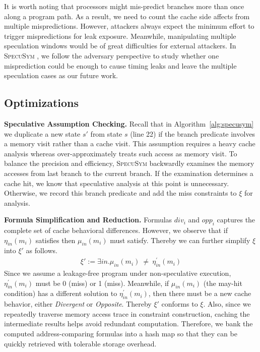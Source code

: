 \documentclass[sigconf]{acmart}
\newcommand{\SpecuSym}{\textsc{SpecuSym} }
\begin{document}
It is worth noting that processors might mis-predict branches more than once 
along a program path. As a result, we need to count the cache side affects 
from multiple mispredictions. However, attackers always expect the minimum 
effort to trigger mispredictions for leak exposure. Meanwhile, manipulating 
multiple speculation windows would be of great difficulties for external 
attackers. In \SpecuSym, we follow the adversary perspective to study whether 
one misprediction could be enough to cause timing leaks and leave the multiple 
speculation cases as our future work. 



\subsection{Optimizations}
\label{sec:optimize}


\textbf{Speculative Assumption Checking.}
Recall that in Algorithm~\ref{alg:specusym} we duplicate a new state $s'$ 
from state $s$ (line 22) if the branch predicate involves a memory visit 
rather than a cache visit. This assumption requires a heavy cache analysis 
whereas \cite{WuW19} over-approximately treats such access as memory visit. 
To balance the precision and efficiency, \SpecuSym backwardly examines the 
memory accesses from last branch to the current branch. If the examination 
determines a cache hit, we know that speculative analysis at this point is 
unnecessary. Otherwise, we record this branch predicate and add the miss 
constraints to $\xi$ for analysis.  


\textbf{Formula Simplification and Reduction.}
Formulas $\mathit{div_i}$ and $\mathit{opp_i}$ captures the complete set of 
cache behavioral differences. However, we observe that if $\mathit{\eta_{in}(m_i)}$ 
satisfies then $\mathit{\mu_{in}(m_i)}$ must satisfy. Thereby we can further 
simplify $\xi$ into $\xi'$ as follows.  
%
\begin{multline}
  \label{eqn:leak}
  ~~~~~~~~~~~~~~~
  \xi':=
  \exists\mathit{in}.
  \mathit{
    \mu_{in}(m_i)~\neq~\eta_{in}^\prime(m_i)
  }
  ~~~~~~~~~~~~~~~
\end{multline}
%
Since we assume a leakage-free program under non-speculative execution, 
$\mathit{\eta_{in}^\prime(m_i)}$ must be 0 (miss) or 1 (miss). Meanwhile, 
if $\mathit{\mu_{in}(m_i)}$ (the may-hit condition) has a different solution 
to $\mathit{\eta_{in}^\prime(m_i)}$, then there must be a new cache behavior, 
either \textit{Divergent} or \textit{Opposite}. Thereby $\xi'$ conforms to 
$\xi$. Also, since we repeatedly traverse memory access trace in constraint 
construction, caching the intermediate results helps avoid redundant 
computation. Therefore, we bank the computed address-comparing formulas into 
a hash map so that they can be quickly retrieved with tolerable storage overhead. 
\end{document}

